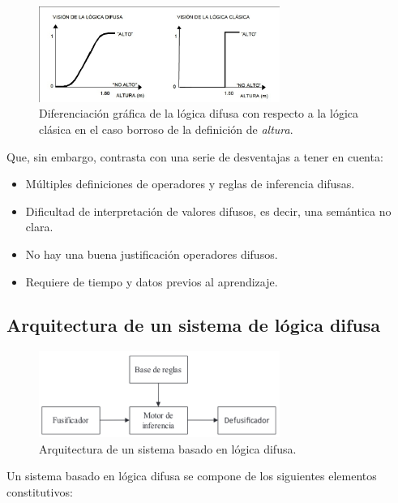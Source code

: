 \documentclass[a4paper, 11pt, titlepage]{article}
\begin{document}
    \begin{figure}[htp]
        \centering
        \includegraphics[width=0.7\textwidth]{resources/logicadifusa2.jpg}
        \caption{Diferenciación gráfica de la lógica difusa con respecto a la lógica clásica en el 
        caso borroso de la definición de \textit{altura}.}
        \label{logicadifusa2}
    \end{figure}

    Que, sin embargo, contrasta con una serie de desventajas a tener en cuenta:

    \begin{itemize}
        \item Múltiples definiciones de operadores y reglas de inferencia difusas.
        \item Dificultad de interpretación de valores difusos, es decir, una semántica no clara.
        \item No hay una buena justificación operadores difusos.
        \item Requiere de tiempo y datos previos al aprendizaje.
    \end{itemize}

    \subsection{Arquitectura de un sistema de lógica difusa}

        \begin{figure}[htp]
            \centering
            \includegraphics[width=0.7\textwidth]{resources/logicadifusa.png}
            \caption{Arquitectura de un sistema basado en lógica difusa.}
            \label{logicadifusa}
        \end{figure}

        Un sistema basado en lógica difusa se compone de los siguientes elementos constitutivos:
\end{document}
